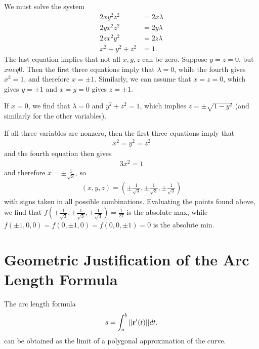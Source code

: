 \documentclass[12pt,letterpaper,reqno]{article}
\numberwithin{equation}{section}
\newcommand{\bbr}{{\bf r}}
\begin{document}
{{\color{red}
\begin{solution}
We must solve the system
\begin{align*}
	2xy^2z^2&=2x\lambda \\
	2yx^2z^2&=2y\lambda \\
	2zx^2y^2&=2z\lambda \\
	x^2+y^2+z^2&=1.
\end{align*}
The last equation implies that not all $x,y,z$ can be zero. Suppose $y=z=0$, but $x neq 0$. Then the first three equations imply that $\lambda=0$, while the fourth gives $x^2= 1$, and therefore $x=\pm 1$. Similarly, we can assume that $x=z=0$, which gives $y=\pm 1$ and $x=y=0$ gives $z=\pm 1$. 

If $x=0$, we find that $\lambda=0$ and $y^2+z^2=1$, which implies $z=\pm \sqrt{1-y^2}$ (and similarly for the other variables).

If all three variables are nonzero, then the first three equations imply that
\begin{align*}
	x^2=y^2=z^2
\end{align*}
and the fourth equation then gives
\begin{align*}
	3x^2=1
\end{align*}
and therefore $x=\pm \frac{1}{\sqrt{3}}$, so
\begin{align*}
	(x,y,z)=(\pm \frac{1}{\sqrt{3}},\pm \frac{1}{\sqrt{3}},\pm \frac{1}{\sqrt{3}})
\end{align*}
with signs taken in all possible combinations. Evaluating the points found above, we find that
	$f(\pm \frac{1}{\sqrt{3}},\pm \frac{1}{\sqrt{3}},\pm \frac{1}{\sqrt{3}})=\frac{1}{27}$ is the absolute max, while $f(\pm 1,0,0)=f(0,\pm 1,0)=f(0,0,\pm 1)=0$ is the absolute min.
\end{solution}}



\appendix
\section{Geometric Justification of the Arc Length Formula}\label{app:arc_length}
\begin{prop}
The arc length formula 
\begin{align}
	s=\int_a^b||\bbr'(t)||dt.
\end{align}
can be obtained as the limit of a polygonal approximation of the curve.
\end{prop}

}
\end{document}
